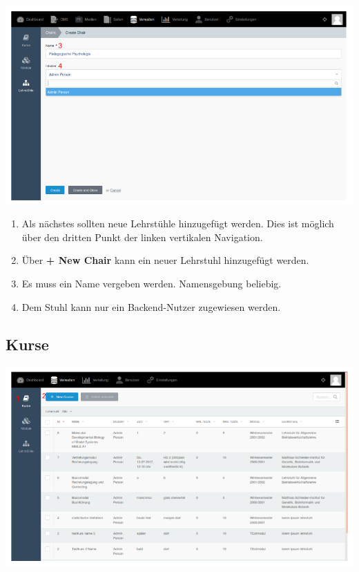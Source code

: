     \includegraphics[scale=0.3]{backend/img/chairs_2.png}
    
    \begin{enumerate}
     \item Als nächstes sollten neue Lehrstühle hinzugefügt werden. Dies ist möglich über den dritten Punkt der linken vertikalen Navigation.
     \item Über \textbf{+ New Chair} kann ein neuer Lehrstuhl hinzugefügt werden.
     \item Es muss ein Name vergeben werden. Namensgebung beliebig.
     \item Dem Stuhl kann nur ein Backend-Nutzer zugewiesen werden.
    \end{enumerate}

    \subsection{Kurse}
    
    \includegraphics[scale=0.3]{backend/img/verwalten_kurse.png}

